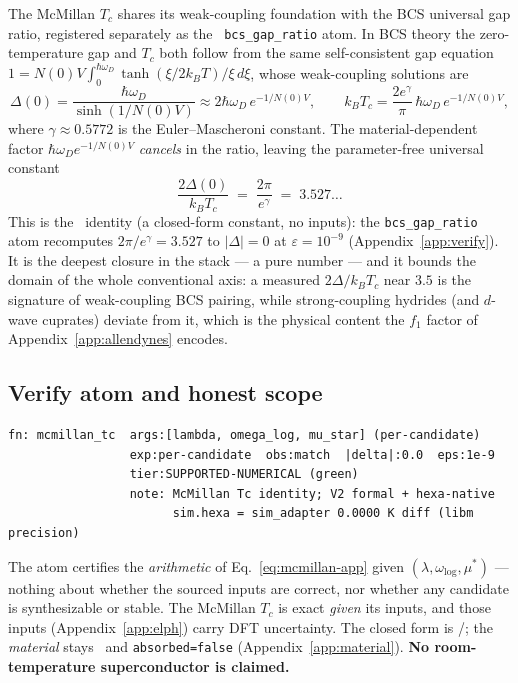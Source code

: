The McMillan $T_c$ shares its weak-coupling foundation with the BCS
universal gap ratio, registered separately as the \tierBlue\
\texttt{bcs\_gap\_ratio} atom. In BCS theory \citep{bcs1957} the
zero-temperature gap and $T_c$ both follow from the same self-consistent
gap equation $1=N(0)V\!\int_0^{\hbar\omega_D}
\tanh(\xi/2k_BT)/\xi\,d\xi$, whose weak-coupling solutions are
\begin{equation}
\Delta(0) = \frac{\hbar\omega_D}{\sinh(1/N(0)V)} \approx 2\hbar\omega_D\,
  e^{-1/N(0)V},
\qquad
k_BT_c = \frac{2 e^{\gamma}}{\pi}\,\hbar\omega_D\, e^{-1/N(0)V},
\label{eq:bcs-gap-tc}
\end{equation}
where $\gamma\!\approx\!0.5772$ is the Euler--Mascheroni constant. The
material-dependent factor $\hbar\omega_D e^{-1/N(0)V}$ \emph{cancels} in
the ratio, leaving the parameter-free universal constant
\begin{equation}
\frac{2\Delta(0)}{k_BT_c} \;=\; \frac{2\pi}{e^{\gamma}}
  \;=\; 3.527\ldots
\label{eq:bcs-ratio}
\end{equation}
This is the \tierBlue\ identity (a closed-form constant, no inputs): the
\texttt{bcs\_gap\_ratio} atom recomputes $2\pi/e^{\gamma}=3.527$ to
$|\Delta|=0$ at $\varepsilon=10^{-9}$ (Appendix~\ref{app:verify}). It is
the deepest closure in the stack --- a pure number --- and it bounds the
domain of the whole conventional axis: a measured $2\Delta/k_BT_c$ near
$3.5$ is the signature of weak-coupling BCS pairing, while strong-coupling
hydrides (and $d$-wave cuprates) deviate from it, which is the physical
content the $f_1$ factor of Appendix~\ref{app:allendynes} encodes.

\subsection{Verify atom and honest scope}
\label{app:mcmillan-honest}

\begin{lstlisting}
fn: mcmillan_tc  args:[lambda, omega_log, mu_star] (per-candidate)
                 exp:per-candidate  obs:match  |delta|:0.0  eps:1e-9
                 tier:SUPPORTED-NUMERICAL (green)
                 note: McMillan Tc identity; V2 formal + hexa-native
                       sim.hexa = sim_adapter 0.0000 K diff (libm precision)
\end{lstlisting}

The atom certifies the \emph{arithmetic} of Eq.~\eqref{eq:mcmillan-app}
given $(\lambda,\omega_{\log},\mu^{*})$ --- nothing about whether the
sourced inputs are correct, nor whether any candidate is synthesizable or
stable. The McMillan $T_c$ is exact \emph{given} its inputs, and those
inputs (Appendix~\ref{app:elph}) carry DFT uncertainty. The closed form is
\tierGreen/\tierBlue; the \emph{material} stays \tierOrange\ and
\texttt{absorbed=false} (Appendix~\ref{app:material}). \textbf{No
room-temperature superconductor is claimed.}
